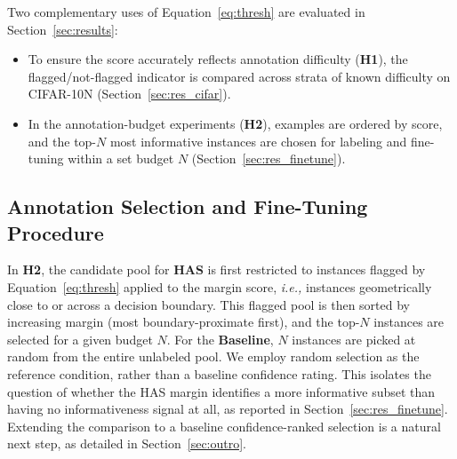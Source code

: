 Two complementary uses of Equation~\ref{eq:thresh} are evaluated in
Section~\ref{sec:results}:
\begin{itemize}
  \item[\textbf{(i)}] To ensure the score accurately reflects annotation 
  difficulty (\textbf{H1}), the flagged/not-flagged indicator is compared 
  across strata of known difficulty on CIFAR-10N (Section~\ref{sec:res_cifar}).

  \item[\textbf{(ii)}] In the annotation-budget experiments (\textbf{H2}), examples 
  are ordered by score, and the top-$N$ most informative instances are chosen for 
  labeling and fine-tuning within a set budget $N$ (Section~\ref{sec:res_finetune}).
\end{itemize}

\subsection{Annotation Selection and Fine-Tuning Procedure}
\label{sec:selection}

In \textbf{H2}, the candidate pool for \textbf{HAS} is first restricted to 
instances flagged by Equation~\ref{eq:thresh} applied to the margin score, \textit{i.e.,} 
instances geometrically close to or across a decision boundary. This flagged pool 
is then sorted by increasing margin (most boundary-proximate first), and the 
top-$N$ instances are selected for a given budget $N$. For the \textbf{Baseline}, 
$N$ instances are picked at random from the entire unlabeled pool. We employ random 
selection as the reference condition, rather than a baseline confidence rating. 
This isolates the question of whether the HAS margin identifies a more informative 
subset than having no informativeness signal at all, as reported in 
Section~\ref{sec:res_finetune}. Extending the comparison to a baseline 
confidence-ranked  selection is a natural next step, as detailed in 
Section~\ref{sec:outro}.



